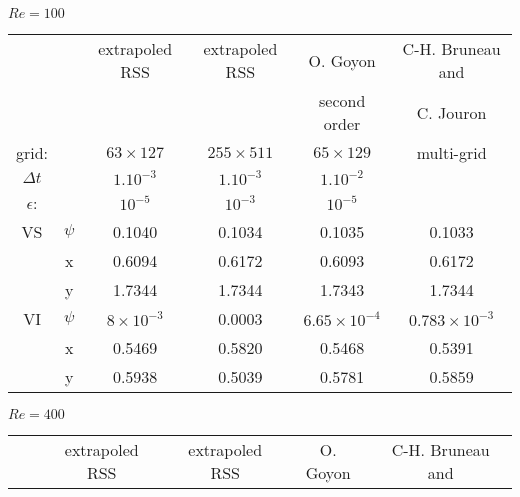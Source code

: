{\begin{table}[!ht]
\begin{center}


$Re=100$

\begin{tabular}{| c|c|c|c|c|c | }
\hline 
                &             & extrapoled RSS     &  extrapoled RSS    & O. Goyon \cite{Goyon} & C-H. Bruneau and\\ 

                &             &                  &                  & second order               & C. Jouron \cite{BruneauJouron}  \\ 
\hline 
grid:      &             & $63 \times 127$  & $255 \times 511$ & $65 \times 129$       & multi-grid \\ 
\hline 
$\Delta t$ &        &       $1.10^{-3}$                &            $1.10^{-3}$            &        $1.10^{-2}$                           & \\
\hline 
$\epsilon$:         &             & $10^{-5}$        & $10^{-3}$        &         $10^{-5}$              &\\ 
\hline 
VS              & $\psi$      & 0.1040           & 0.1034           & 0.1035                & 0.1033\\ 

                & x           & 0.6094           & 0.6172           & 0.6093                & 0.6172\\ 

                & y           & 1.7344           & 1.7344           & 1.7343                & 1.7344\\ 
\hline 
VI              & $\psi$      & $8 \times 10^{-3}$& 0.0003           & $6.65 \times 10^{-4}$& $0.783 \times 10^{-3}$\\ 

                & x           & 0.5469          & 0.5820           & 0.5468                 & 0.5391\\ 
                
                & y           & 0.5938           & 0.5039           & 0.5781                & 0.5859\\ 
\hline
\end{tabular} 

\vspace{0.5cm}

$Re=400$

\begin{tabular}{ |  c|c|c|c|c|c | }
\hline 
                &             &  extrapoled RSS    &  extrapoled RSS    & O. Goyon \cite{Goyon} & C-H. Bruneau and\\ 


\end{tabular}
\end{center}
\end{table}}
